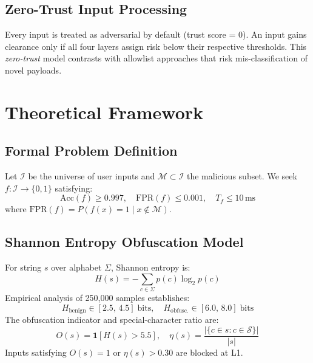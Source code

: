 \documentclass[10pt,twocolumn]{article}
\begin{document}
\subsection{Zero-Trust Input Processing}

Every input is treated as adversarial by default (trust score = 0).
An input gains clearance only if all four layers assign risk below their
respective thresholds. This \emph{zero-trust} model contrasts with
allowlist approaches that risk mis-classification of novel payloads.

\section{Theoretical Framework}
\label{sec:theory}

\subsection{Formal Problem Definition}

Let $\mathcal{I}$ be the universe of user inputs and
$\mathcal{M} \subset \mathcal{I}$ the malicious subset. We seek
$f: \mathcal{I} \rightarrow \{0,1\}$ satisfying:
\begin{equation}
  \text{Acc}(f) \geq 0.997, \quad \text{FPR}(f) \leq 0.001,
  \quad T_f \leq 10\,\text{ms}
\end{equation}
where $\text{FPR}(f) = P(f(x)=1 \mid x \notin \mathcal{M})$.

\subsection{Shannon Entropy Obfuscation Model}

For string $s$ over alphabet $\Sigma$, Shannon entropy is:
\begin{equation}
  H(s) = -\sum_{c \in \Sigma} p(c)\log_2 p(c)
\end{equation}
Empirical analysis of 250,000 samples establishes:
\begin{equation}
  H_{\text{benign}} \in [2.5,\,4.5]\;\text{bits}, \quad
  H_{\text{obfusc.}} \in [6.0,\,8.0]\;\text{bits}
\end{equation}
The obfuscation indicator and special-character ratio are:
\begin{equation}
  O(s) = \mathbf{1}[H(s) > 5.5], \quad
  \eta(s) = \frac{|\{c \in s : c \in \mathcal{S}\}|}{|s|}
\end{equation}
Inputs satisfying $O(s)=1$ or $\eta(s)>0.30$ are blocked at L1.
\end{document}
